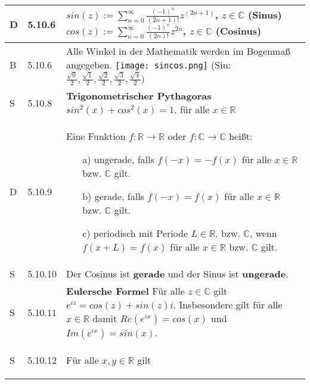     \begin{longtable}{p{0.75cm} p{1cm} p{16cm}}
        \toprule

        D   & 5.10.6&   $sin(z) := \sum^{\infty}_{n=0} \frac{(-1)^n}{(2n+1)!} z^(2n+1)$, $z \in \mathbb{C}$ (\textbf{Sinus}) \hfill \break
                        $cos(z) := \sum^{\infty}_{n=0} \frac{(-1)^n}{(2n)!}z^{2n}$, $z \in \mathbb{C}$ (\textbf{Cosinus}) \\
        \midrule
        B   & 5.10.6 &  Alle Winkel in der Mathematik werden im Bogenmaß angegeben. \hfill \break
                        \texttt{[image: sincos.png]} \hfill \break
                        (Sin: $\frac{\sqrt{0}}{2},\frac{\sqrt{1}}{2},\frac{\sqrt{2}}{2},\frac{\sqrt{3}}{2},\frac{\sqrt{4}}{2})$\\
        \midrule
        S   & 5.10.8&   \textbf{Trigonometrischer Pythagoras}\hfill \break
                        $sin^2(x) + cos^2(x) = 1$, für alle $x \in \mathbb{R}$ \\
        \midrule
        D   & 5.10.9&   Eine Funktion $f: \mathbb{R} \rightarrow \mathbb{R}$ oder $f: \mathbb{C} \rightarrow \mathbb{C}$ heißt: 
                        \begin{itemize}[topsep=-0.5cm]
                            \item[a)] ungerade, falls $f(-x) = -f(x)$ für alle $x \in \mathbb{R}$ bzw. $\mathbb{C}$ gilt.
                            \item[b)] gerade, falls $f(-x) = f(x)$ für alle $x \in \mathbb{R}$ bzw. $\mathbb{C}$ gilt.
                            \item[c)] periodisch mit Periode $L \in \mathbb{R}$, bzw. $\mathbb{C}$, wenn $f(x+L) = f(x)$ für alle $x \in \mathbb{R}$ bzw. $\mathbb{C}$ gilt.
                        \end{itemize} \vspace{-0cm}\\
        \midrule
        S   & 5.10.10&  Der Cosinus ist \textbf{gerade} und der Sinus ist \textbf{ungerade}. \\
        \midrule
        S   & 5.10.11&  \textbf{Eulersche Formel} \hfill \break
                        Für alle $z \in \mathbb{C}$ gilt $e^{iz} = cos(z)+sin(z)i$. \hfill \break
                        Insbesondere gilt für alle $x \in \mathbb{R}$ damit $Re(e^{ix}) = cos(x)$ und $Im(e^{ix})=sin(x)$. \\
        \midrule
        S   & 5.10.12&  Für alle $x,y \in \mathbb{R}$ gilt 
                        \begin{itemize}[topsep=-0.5cm]

\end{itemize}
\end{longtable}
